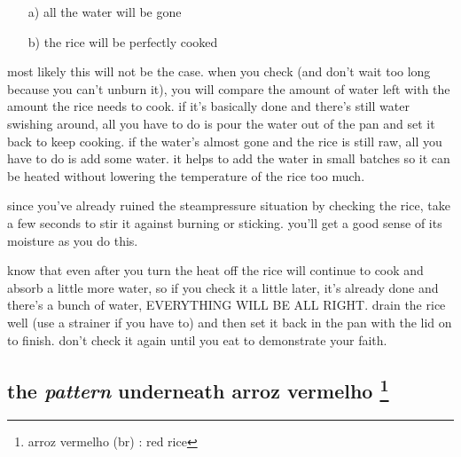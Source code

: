\begin{enumerate}
  \item[a)] all the water will be gone 

  \item[b)] the rice will be perfectly cooked
\end{enumerate}

most likely this will not be the case. when you check (and don't
wait too long because you can't unburn it), you will compare the
amount of water left with the amount the rice needs to cook. if
it's basically done and there's still water swishing around, all
you have to do is pour the water out of the pan and set it back to
keep cooking. if the water's almost gone and the rice is still raw,
all you have to do is add some water. it helps to add the water in
small batches so it can be heated without lowering the temperature of
the rice too much.

since you've already ruined the steampressure situation by checking
the rice, take a few seconds to stir it against burning or
sticking. you'll get a good sense of its moisture as you do this.

know that even after you turn the heat off the rice will continue to
cook and absorb a little more water, so if you check it a little
later, it's already done and there's a bunch of water, EVERYTHING WILL
BE ALL RIGHT. drain the rice well (use a strainer if you have to) and
then set it back in the pan with the lid on to finish. don't check it
again until you eat to demonstrate your faith.

\subsection{the \textit{pattern} underneath arroz vermelho
\footnote{arroz vermelho (br) : red rice}}

